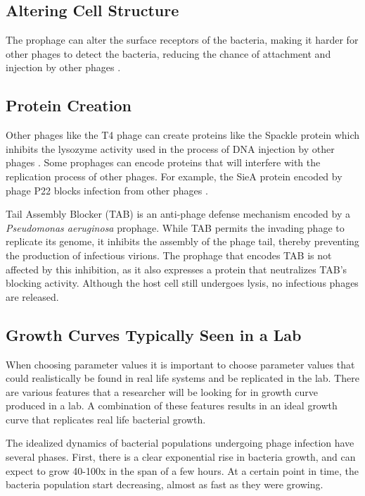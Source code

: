 \subsection{Altering Cell Structure}
The prophage can alter the surface receptors of the bacteria, making it harder for other phages to detect the bacteria, reducing the chance of attachment and injection by other phages \cite{bucherPhageMachineSIEence2024}. 

\subsection{Protein Creation}
Other phages like the T4 phage can create proteins like the Spackle protein which inhibits the lysozyme activity used in the process of DNA injection by other phages \cite{bucherPhageMachineSIEence2024, kanamaruStructureFunctionT42020}. 
Some prophages can encode proteins that will interfere with the replication process of other phages. 
For example, the SieA protein encoded by phage P22 blocks infection from other phages \cite{leavittBacteriophageP22SieAmediated2024}. 

Tail Assembly Blocker (TAB) is an anti-phage defense mechanism encoded by a \textit{Pseudomonas aeruginosa} prophage. 
While TAB permits the invading phage to replicate its genome, it inhibits the assembly of the phage tail, thereby preventing the production of infectious virions. 
The prophage that encodes TAB is not affected by this inhibition, as it also expresses a protein that neutralizes TAB's blocking activity. 
Although the host cell still undergoes lysis, no infectious phages are released.

\subsection{Growth Curves Typically Seen in a Lab}
\label{sec:literaturereview:growth_curves_typically_seen_in_a_lab}

When choosing parameter values it is important to choose parameter values that could realistically be found in real life systems and be replicated in the lab. 
There are various features that a researcher will be looking for in growth curve produced in a lab.
A combination of these features results in an ideal growth curve that replicates real life bacterial growth. 

The idealized dynamics of bacterial populations undergoing phage infection have several phases. First, there is a clear exponential rise in bacteria growth, and can expect to grow 40-100x in the span of a few hours. 
At a certain point in time, the bacteria population start decreasing, almost as fast as they were growing. 

